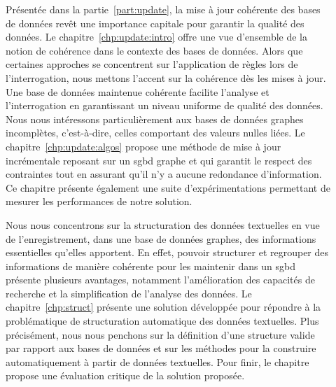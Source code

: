 \begin{description}
    \item[] Présentée dans la partie~\ref{part:update}, la mise à jour cohérente des bases de données revêt une importance capitale pour garantir la qualité des données.
    Le chapitre~\ref{chp:update:intro} offre une vue d'ensemble de la notion de cohérence dans le contexte des bases de données.
    Alors que certaines approches se concentrent sur l'application de règles lors de l'interrogation, nous mettons l'accent sur la cohérence dès les mises à jour.
    Une base de données maintenue cohérente facilite l'analyse et l'interrogation en garantissant un niveau uniforme de qualité des données.
    Nous nous intéressons particulièrement aux bases de données graphes incomplètes, c'est-à-dire, celles comportant des valeurs nulles liées.
    Le chapitre~\ref{chp:update:algos} propose une méthode de mise à jour incrémentale reposant sur un \gls{sgbd} graphe et qui garantit le respect des contraintes tout en assurant qu'il n'y a aucune redondance d'information.
    Ce chapitre présente également une suite d'expérimentations permettant de mesurer les performances de notre solution.

    \item[] Nous nous concentrons sur la structuration des données textuelles en vue de l'enregistrement, dans une base de données graphes, des informations essentielles qu'elles apportent.
    En effet, pouvoir structurer et regrouper des informations de manière cohérente pour les maintenir dans un \gls{sgbd} présente plusieurs avantages, notamment l'amélioration des capacités de recherche et la simplification de l'analyse des données.
    Le chapitre~\ref{chp:struct} présente une solution développée pour répondre à la problématique de structuration automatique des données textuelles.
    Plus précisément, nous nous penchons sur la définition d'une structure valide par rapport aux bases de données et sur les méthodes pour la construire automatiquement à partir de données textuelles.
    Pour finir, le chapitre propose une évaluation critique de la solution proposée.


\end{description}
